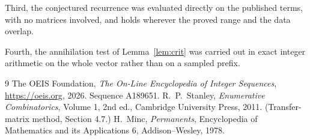 \documentclass[11pt,a4paper]{article}
\theoremstyle{plain}
\theoremstyle{definition}
\begin{document}
Third, the conjectured recurrence was evaluated directly on the published terms, with no
matrices involved, and holds wherever the proved range and the data overlap.

Fourth, the annihilation test of Lemma~\ref{lem:crit} was carried out in exact integer
arithmetic on the whole vector rather than on a sampled prefix.

\begin{thebibliography}{9}
 The OEIS Foundation, \emph{The On-Line Encyclopedia of Integer
Sequences}, \url{https://oeis.org}, 2026. Sequence A189651.
 R.~P.~Stanley, \emph{Enumerative Combinatorics}, Volume 1, 2nd ed.,
Cambridge University Press, 2011. (Transfer-matrix method, Section 4.7.)
 H.~Minc, \emph{Permanents}, Encyclopedia of Mathematics and its
Applications 6, Addison--Wesley, 1978.
\end{thebibliography}
\end{document}
